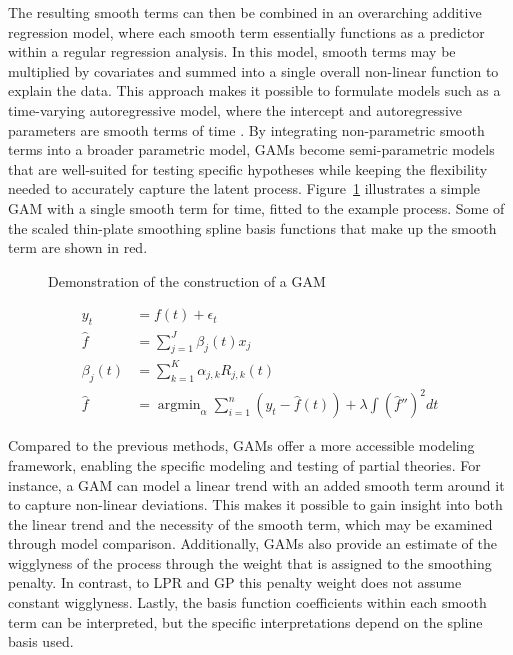 \documentclass[man, floatsintext]{apa7}
\DeclareMathOperator*{\argmin}{argmin}
\begin{document}
The resulting smooth terms can then be combined in an overarching additive
regression model, where each smooth term essentially functions as a
predictor within a regular regression
analysis. In this model, smooth terms may be multiplied by covariates and
summed into a single overall non-linear function to explain the data. This
approach makes it possible to formulate models such as a time-varying
autoregressive model, where the intercept and autoregressive parameters are
smooth terms of time \parencite{bringmann_changing_2017,
  bringmann_modeling_2015}. By integrating non-parametric smooth terms into a
broader parametric model, GAMs become semi-parametric models that are
well-suited for testing specific hypotheses while keeping the flexibility
needed to accurately capture the latent process. Figure~\ref{fig:gam_dem}
illustrates a simple GAM with a single smooth term for time, fitted to the
example process. Some of the scaled thin-plate smoothing spline basis
functions that make up the smooth term are shown in red.

\begin{figure}[!ht]
  \caption{Demonstration of the construction of a GAM}
  \label{fig:gam_dem}
\end{figure}

\begin{equation}\label{eq:gam_equations}
  \begin{aligned}
    y_t        & = f(t) + \epsilon_t                                \\
    \hat{f}    & = \sum^J_{j=1} \beta_j(t)x_j                       \\
    \beta_j(t) & = \sum^K_{k=1} \alpha_{j, k} R_{j, k}(t)           \\
    \hat{f}    & = \argmin_\alpha \sum^n_{i=1} (y_t - \hat{f}(t)) +
    \lambda \int (\hat{f}'')^2 dt
  \end{aligned}
\end{equation}

Compared to the previous methods, GAMs offer a more accessible modeling
framework,
enabling the specific modeling and testing of partial theories. For instance, a
GAM can model a linear trend with an added smooth term around it to capture
non-linear deviations. This makes it possible to gain insight into both
the linear trend and the necessity of the smooth term, which may be examined
through model comparison.
Additionally, GAMs also provide an estimate of the wigglyness
of the process through the weight that is assigned to the smoothing penalty.
In contrast, to LPR and GP
this penalty weight does not assume constant wigglyness. Lastly, the
basis function coefficients within each smooth term can be interpreted,
but the specific interpretations depend on the spline basis used.
\end{document}
